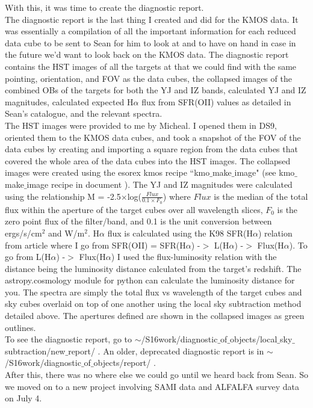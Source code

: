 \documentclass[10pt,letterpaper]{article}
\begin{document}
With this, it was time to create the diagnostic report.\\

The diagnostic report is the last thing I created and did for the KMOS data. It was essentially a compilation of all the important information for each reduced data cube to be sent to Sean for him to look at and to have on hand in case in the future we'd want to look back on the KMOS data. The diagnostic report contains the HST images of all the targets at that we could find with the same pointing, orientation, and FOV as the data cubes, the collapsed images of the combined OBs of the targets for both the YJ and IZ bands, calculated YJ and IZ magnitudes, calculated expected H$\alpha$ flux from SFR(OII) values as detailed in Sean's catalogue, and the relevant spectra.\\

The HST images were provided to me by Micheal. I opened them in DS9, oriented them to the KMOS data cubes, and took a snapshot of the FOV of the data cubes by creating and importing a square region from the data cubes that covered the whole area of the data cubes into the HST images. The collapsed images were created using the esorex kmos recipe ``kmo$\_$make$\_$image" (see kmo$\_$make$\_$image recipe in document \cite{KMOS pipeline manual}). The YJ and IZ magnitudes were calculated using the relationship M = -2.5$\times$log($\frac{Flux}{0.1 \times F_0}$) where $Flux$ is the median of the total flux within the aperture of the target cubes over all wavelength slices, $F_0$ is the zero point flux of the filter/band, and 0.1 is the unit conversion between ergs/s/cm$^2$ and W/m$^2$. H$\alpha$ flux is calculated using the K98 SFR(H$\alpha$) relation from article \cite{K98} where I go from SFR(OII) = SFR(H$\alpha$) -$>$ L(H$\alpha$) -$>$ Flux(H$\alpha$). To go from L(H$\alpha$) -$>$ Flux(H$\alpha$) I used the flux-luminosity relation with the distance being the luminosity distance calculated from the target's redshift. The astropy.cosmology module for python can calculate the luminosity distance for you. The spectra are simply the total flux vs wavelength of the target cubes and sky cubes overlaid on top of one another using the local sky subtraction method detailed above. The apertures defined are shown in the collapsed images as green outlines.\\

To see the diagnostic report, go to $\sim$/S16work/diagnostic$\_$of$\_$objects/local$\_$sky$\_$subtraction/new$\_$report/ . An older, deprecated diagnostic report is in $\sim$/S16work/diagnostic$\_$of$\_$objects/report/ .\\

After this, there was no where else we could go until we heard back from Sean. So we moved on to a new project involving SAMI data and ALFALFA survey data on July 4.
\end{document}
